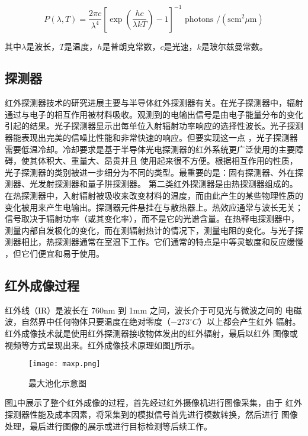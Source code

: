 \begin{equation}
    P(\lambda, T)=\frac{2 \pi c}{\lambda^{4}}\left[\exp \left(\frac{h c}{\lambda k T}\right)-1\right]^{-1} \text { photons } /\left(\mathrm{s} \mathrm{cm}^{2} \mu \mathrm{m}\right)
    \label{plank2}    
\end{equation}

其中$\lambda$是波长，$T$是温度，$h$是普朗克常数，$c$是光速，$k$是玻尔兹曼常数。

\subsection{探测器}
红外探测器技术的研究进展主要与半导体红外探测器有关。在光子探测器中，辐射通过与电子的相互作用被材料吸收。观测到的电输出信号是由电子能量分布的变化引起的结果。光子探测器显示出每单位入射辐射功率响应的选择性波长。光子探测器能表现出完美的信噪比性能和非常快速的响应。但要实现这一点
，光子探测器需要低温冷却。冷却要求是基于半导体光电探测器的红外系统更广泛使用的主要障碍，使其体积大、重量大、昂贵并且
使用起来很不方便。根据相互作用的性质，光子探测器的类别被进一步细分为不同的类型。最重要的是：固有探测器、外在探测器、光发射探测器和量子阱探测器。
第二类红外探测器是由热探测器组成的。在热探测器中，入射辐射被吸收来改变材料的温度，而由此产生的某些物理性质的变化被用来产生电输出。探测器元件悬挂在与散热器上。热效应通常与波长无关；信号取决于辐射功率（或其变化率），而不是它的光谱含量。在热释电探测器中，测量内部自发极化的变化，而在测辐射热计的情况下，测量电阻的变化。与光子探测器相比，热探测器通常在室温下工作。它们通常的特点是中等灵敏度和反应缓慢
，但它们便宜和易于使用。

\subsection{红外成像过程}
红外线（IR）是波长在 760nm 到 1mm 之间，波长介于可见光与微波之间的
电磁波，自然界中任何物体只要温度在绝对零度（$-273 ^{\circ}C$）以上都会产生红外
辐射。红外成像技术就是使用红外探测器接收物体发出的红外辐射，最后以红外
图像或视频等方式呈现出来。红外成像技术原理如图\ref{infra}所示\cite{倪国强2008中国红外成像技术发展的若干思考}。

\begin{figure}[htbp]
    \centering
    \texttt{[image: maxp.png]}
    \caption{最大池化示意图}
    \label{infra}
\end{figure}

图\ref{infra}中展示了整个红外成像的过程，首先经过红外摄像机进行图像采集，由于
红外探测器性能及成本因素，将采集到的模拟信号首先进行模数转换，然后进行
图像处理，最后进行图像的展示或进行目标检测等后续工作。

